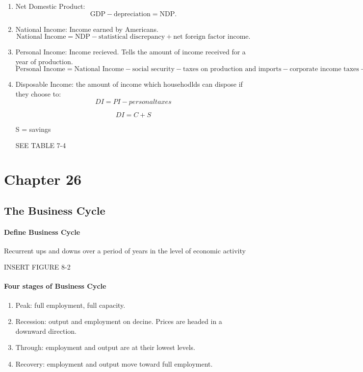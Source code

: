 \begin{enumerate}
	\item Net Domestic Product:
		\[
			\text{GDP} - \text{depreciation} = \text{NDP}.
		\]

	\item National Income: Income earned by Americans.
		\[
			\text{National Income} = \text{NDP} - \text{statistical discrepancy} + \text{net foreign factor income}.
		\]

	\item Personal Income: Income recieved. Tells the amount of income received for a year of production.
		\[
			\text{Personal Income} = \text{National Income} - \text{social security} - \text{taxes on production and imports} - \text{corporate income taxes} - \text{undistributed corporate profits} + \text{income received} 
		\]

	\item Disposable Income: the amount of income which househodlds can dispose if they choose to:
		 \[
			DI = PI - personal taxes
		\]

		\[
			DI = C + S
		\]

		S = savings

		SEE TABLE 7-4

\end{enumerate}

\newpage
\section{Chapter 26}

\subsection{The Business Cycle}

\paragraph{Define Business Cycle} Recurrent ups and downs over a period of years in the level of economic activity

INSERT FIGURE 8-2

\paragraph{Four stages of Business Cycle}

\begin{enumerate}
	\item Peak: full employment, full capacity.

	\item Recession: output and employment on decine. Prices are headed in a downward direction.

	\item Through: employment and output are at their lowest levels.

	\item Recovery: employment and output move toward full employment.

\end{enumerate}

